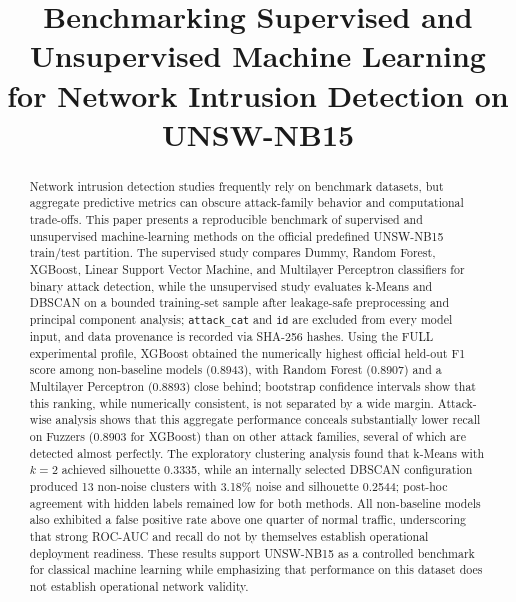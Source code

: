 \documentclass[conference]{IEEEtran}
\begin{document}
\title{Benchmarking Supervised and Unsupervised Machine Learning for Network Intrusion Detection on UNSW-NB15}

\author{
}

\maketitle

\begin{abstract}
Network intrusion detection studies frequently rely on benchmark datasets, but aggregate predictive metrics can obscure attack-family behavior and computational trade-offs. This paper presents a reproducible benchmark of supervised and unsupervised machine-learning methods on the official predefined UNSW-NB15 train/test partition. The supervised study compares Dummy, Random Forest, XGBoost, Linear Support Vector Machine, and Multilayer Perceptron classifiers for binary attack detection, while the unsupervised study evaluates k-Means and DBSCAN on a bounded training-set sample after leakage-safe preprocessing and principal component analysis; \texttt{attack\_cat} and \texttt{id} are excluded from every model input, and data provenance is recorded via SHA-256 hashes. Using the FULL experimental profile, XGBoost obtained the numerically highest official held-out F1 score among non-baseline models (0.8943), with Random Forest (0.8907) and a Multilayer Perceptron (0.8893) close behind; bootstrap confidence intervals show that this ranking, while numerically consistent, is not separated by a wide margin. Attack-wise analysis shows that this aggregate performance conceals substantially lower recall on Fuzzers (0.8903 for XGBoost) than on other attack families, several of which are detected almost perfectly. The exploratory clustering analysis found that k-Means with $k=2$ achieved silhouette 0.3335, while an internally selected DBSCAN configuration produced 13 non-noise clusters with 3.18\% noise and silhouette 0.2544; post-hoc agreement with hidden labels remained low for both methods. All non-baseline models also exhibited a false positive rate above one quarter of normal traffic, underscoring that strong ROC-AUC and recall do not by themselves establish operational deployment readiness. These results support UNSW-NB15 as a controlled benchmark for classical machine learning while emphasizing that performance on this dataset does not establish operational network validity.
\end{abstract}
\end{document}
